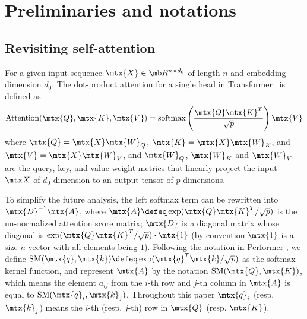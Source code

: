 \section{Preliminaries and notations}

\subsection{Revisiting self-attention}

For a given input sequence $\mtx{X} \in \mb R^{n \times d_0}$ of length $n$ and embedding dimension $d_0$,
The dot-product attention for a single head in Transformer~\cite{DBLP:conf/nips/VaswaniSPUJGKP17} is defined as
\begin{equation}
    \nonumber
    \text{Attention}(\mtx{Q},\mtx{K},\mtx{V}) = \text{softmax}\left(\frac{\mtx{Q} \mtx{K}^{T}}{\sqrt{p}}\right) \mtx{V}
\end{equation}
where $\mtx{Q} = \mtx{X} \mtx{W}_Q$, $\mtx{K} = \mtx{X} \mtx{W}_K$, and $\mtx{V} = \mtx{X} \mtx{W}_V$,
and $\mtx{W}_Q$, $\mtx{W}_K$ and $\mtx{W}_V$ are the query, key, and value weight metrics that linearly project the input $\mtx X$ of $d_0$ dimension to an output tensor of $p$ dimensions.

To simplify the future analysis, the left softmax term can be rewritten into $\mtx{D}^{-1} \mtx{A}$,
where $\mtx{A} \defeq \exp(\mtx{Q} \mtx{K}^{T} / \sqrt{p})$ is the un-normalized attention score matrix; 
$\mtx{D}$ is a diagonal matrix whose diagonal is $\exp(\mtx{Q} \mtx{K}^{T} / \sqrt{p}) \cdot \mtx{1}$ (by convention $\mtx{1}$ is a size-$n$ vector with all elements being $1$).
Following the notation in Performer \citep{DBLP:journals/corr/abs-2009-14794},
we define $\text{SM}(\mtx{q}, \mtx{k}) \defeq \exp(\mtx{q}^T \mtx{k} / \sqrt{p})$ as the softmax kernel function,
and represent $\mtx{A}$ by the notation $\text{SM}(\mtx{Q}, \mtx{K})$, which means the element $a_{ij}$ from the $i$-th row and $j$-th column in $\mtx{A}$ is equal to $\text{SM}(\mtx{q}_i, \mtx{k}_j)$.
Throughout this paper $\mtx{q}_i$ (resp. $\mtx{k}_j$) means the $i$-th (resp. $j$-th) row in $\mtx{Q}$ (resp. $\mtx{K}$).


